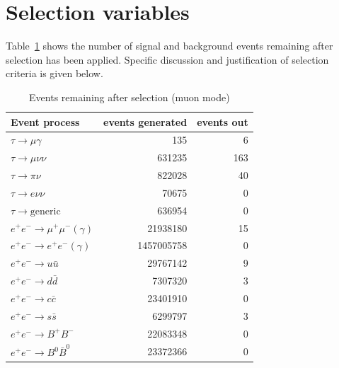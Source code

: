 \documentclass[12pt]{thesis}  %
\begin{document}
\section{Selection variables}

Table~\ref{tab:tauMG events after selection} shows the number of signal and background events remaining after selection has been applied. Specific discussion and justification of selection criteria is given below. 

\begin{table}[h]
\centering
\begin{tabular}{lrr}
\textbf{Event process}         & \textbf{events generated} & \textbf{events out} \\ \hline 
\rowcolor[HTML]{EFEFEF} 
$\tau\to\mu\gamma$       & \num{135}        & 6                             \\
$\tau\to\mu\nu\nu$      & \num{631235}             & 163                    \\
$\tau\to\pi\nu$         & \num{822028}                & 40                                     \\
$\tau\to e\nu\nu$       & \num   {70675}              & 0                                  \\
$\tau\to\text{generic}$  & \num{636954}           & 0                                   \\
$e^+ e^- \to \mu^+ \mu^- (\gamma)$       & \num{21938180}        & 15             \\
$e^+ e^- \to e^+ e^- (\gamma)$      & \num{1457005758}      & 0                               \\
$e^+ e^- \to u \bar{u}$       & \num{29767142}           & 9                                 \\
$e^+ e^- \to d \bar{d}$        & \num{7307320}           & 3                                \\
$e^+ e^- \to c \bar{c}$        & \num{23401910}           & 0                            \\
$e^+ e^- \to s \bar{s}$       & \num{6299797}           & 3                                       \\
$e^+ e^- \to B^+ B^-$     & \num{22083348}           & 0                            \\
$e^+ e^- \to B^0 \bar{B}^0$       & \num{23372366}           & 0                           
\end{tabular}
\caption[]%
{{\small Events remaining after selection (muon mode)}}
\label{tab:tauMG events after selection}
\end{table}
\end{document}
